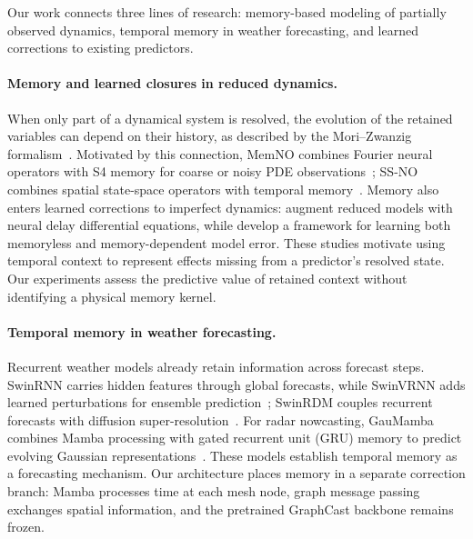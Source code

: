 \documentclass{article}
\begin{document}
Our work connects three lines of research: memory-based modeling of partially observed dynamics, temporal memory in weather forecasting, and learned corrections to existing predictors.

\paragraph{Memory and learned closures in reduced dynamics.}
When only part of a dynamical system is resolved, the evolution of the retained variables can depend on their history, as described by the Mori--Zwanzig formalism~\citep{YenTingLinMZ2021}. Motivated by this connection, MemNO combines Fourier neural operators with S4 memory for coarse or noisy PDE observations~\citep{buitrago2025memory}; SS-NO combines spatial state-space operators with temporal memory~\citep{koren2025ssno}. Memory also enters learned corrections to imperfect dynamics: \citet{gupta2021neuralclosures} augment reduced models with neural delay differential equations, while \citet{levine2022modelerror} develop a framework for learning both memoryless and memory-dependent model error. These studies motivate using temporal context to represent effects missing from a predictor's resolved state. Our experiments assess the predictive value of retained context without identifying a physical memory kernel.

\paragraph{Temporal memory in weather forecasting.}
Recurrent weather models already retain information across forecast steps. SwinRNN carries hidden features through global forecasts, while SwinVRNN adds learned perturbations for ensemble prediction~\citep{hu2023swinvrnn}; SwinRDM couples recurrent forecasts with diffusion super-resolution~\citep{chen2023swinrdm}. For radar nowcasting, GauMamba combines Mamba processing with gated recurrent unit (GRU) memory to predict evolving Gaussian representations~\citep{wang2025gaumamba}. These models establish temporal memory as a forecasting mechanism. Our architecture places memory in a separate correction branch: Mamba processes time at each mesh node, graph message passing exchanges spatial information, and the pretrained GraphCast backbone remains frozen.
\end{document}
